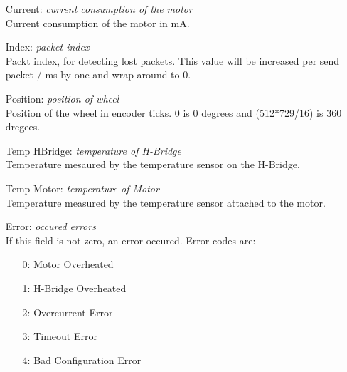 \documentclass{article}
\begin{document}
\begin{itemize}
  \item[Current: ] {\it current consumption of the motor}\\
    Current consumption of the motor in mA.

  \item[Index: ] {\it packet index}\\
    Packt index, for detecting lost packets. This value will be
    increased per send packet / ms by one and wrap around to 0.

  \item[Position: ] {\it position of wheel }\\
    Position of the wheel in encoder ticks. 0 is 0 degrees and
    (512*729/16) is 360 dregees.

  \item[Temp HBridge: ] {\it temperature of H-Bridge}\\
    Temperature mesaured by the temperature sensor on the H-Bridge.

  \item[Temp Motor: ] {\it temperature of Motor}\\
    Temperature measured by the temperature sensor attached to the
    motor.

  \item[Error: ] {\it occured errors}\\
    If this field is not zero, an error occured. Error codes are:
    \begin{itemize}
      \item[0: ] Motor Overheated
      \item[1: ] H-Bridge Overheated
      \item[2: ] Overcurrent Error
      \item[3: ] Timeout Error
      \item[4: ] Bad Configuration Error
    \end{itemize}
\end{itemize}
\end{document}
